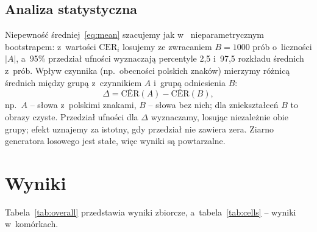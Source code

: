 \documentclass[runningheads]{llncs}
\begin{document}
\subsection{Analiza statystyczna}
Niepewność średniej~\eqref{eq:mean} szacujemy jak w~\cite{yilmaz2026} nieparametrycznym bootstrapem:
z~wartości $\mathrm{CER}_i$ losujemy ze zwracaniem $B=1000$ prób o~liczności $|A|$, a~95\% przedział
ufności wyznaczają percentyle 2,5 i~97,5 rozkładu średnich z~prób. Wpływ czynnika (np.\ obecności
polskich znaków) mierzymy różnicą średnich między grupą z~czynnikiem $A$ i~grupą odniesienia $B$:
\begin{equation}\label{eq:delta}
  \Delta = \overline{\mathrm{CER}}(A) - \overline{\mathrm{CER}}(B),
\end{equation}
np.\ $A$ -- słowa z~polskimi znakami, $B$ -- słowa bez nich; dla zniekształceń $B$ to obrazy czyste.
Przedział ufności dla $\Delta$ wyznaczamy, losując niezależnie obie grupy; efekt uznajemy za istotny,
gdy przedział nie zawiera zera. Ziarno generatora losowego jest stałe, więc wyniki są powtarzalne.

\section{Wyniki}

Tabela~\ref{tab:overall} przedstawia wyniki zbiorcze, a~tabela~\ref{tab:cells} -- wyniki w~komórkach.

\begin{table}
  \caption{Średni CER~\eqref{eq:mean} według typu tekstu z~95\% przedziałem ufności (bootstrap), WER dla
  zdań, odsetek błędów wyłącznie diakrytycznych~\eqref{eq:diacr} i~czas na obraz (CPU).}
  \label{tab:overall}
  \centering\small
  
\end{table}

\begin{table}
  \caption{Średni CER w~komórkach: tekst drukowany / odręczny.}
  \label{tab:cells}
  \centering
  \resizebox{\textwidth}{!}{}
\end{table}

\begin{table}
  \caption{Wpływ czynników: różnica średniego CER $\Delta$~\eqref{eq:delta} między grupą z~czynnikiem
  a~grupą odniesienia (dla zniekształceń: obrazy czyste). Pogrubienie: 95\% przedział ufności nie
  zawiera zera.}
  \label{tab:effects}
  \centering\small
  
\end{table}
\end{document}

